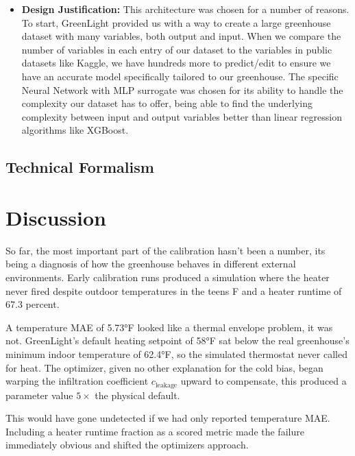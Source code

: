 \documentclass{article}
\begin{document}
\begin{itemize}
    \item \textbf{Design Justification:} This architecture was chosen for a number of reasons. To start, GreenLight provided us with a way to create a large greenhouse dataset with many variables, both output and input. When we compare the number of variables in each entry of our dataset to the variables in public datasets like Kaggle, we have hundreds more to predict/edit to ensure we have an accurate model specifically tailored to our greenhouse. The specific Neural Network with MLP surrogate was chosen for its ability to handle the complexity our dataset has to offer, being able to find the underlying complexity between input and output variables better than linear regression algorithms like XGBoost. 
    
\end{itemize}

\subsection{Technical Formalism}

\section{Discussion}
 So far, the most important part of the calibration hasn't been a number, its being a diagnosis of how the greenhouse behaves in different external environments. Early calibration runs produced a simulation where the heater never fired despite outdoor temperatures in the teens F and a heater runtime of 67.3 percent. 
 
 A temperature MAE of 5.73°F looked like a thermal envelope problem, it was not. GreenLight's default heating setpoint of 58°F sat below the real greenhouse's minimum indoor temperature of 62.4°F, so the simulated thermostat never called for heat. The optimizer, given no other explanation for the cold bias, began warping the infiltration coefficient $c_{\text{leakage}}$ upward to compensate, this produced a parameter value $5\times$ the physical default. 
 
 This would have gone undetected if we had only reported temperature MAE. Including a heater runtime fraction as a scored metric made the failure immediately obvious and shifted the optimizers approach.
\end{document}
